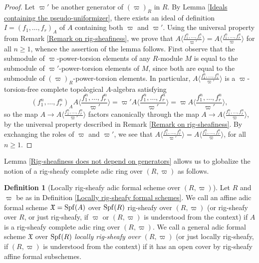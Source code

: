 \documentclass[12pt,twoside,a4paper]{article}
\theoremstyle{definition}
\newtheorem{mydef}[thm]{Definition}
\theoremstyle{remark}
\newcommand\Spf{{\rm Spf}}
\begin{document}
\begin{proof}Let $\varpi'$ be another generator of $(\varpi)_{R}$ in $R$. By Lemma \ref{Ideals containing the pseudo-uniformizer}, there exists an ideal of definition $I=(f_1,\dots,f_r)_{A}$ of $A$ containing both $\varpi$ and $\varpi'$. Using the universal property from Remark \ref{Remark on rig-sheafiness}, we prove that $A\langle\frac{f_1^{n},\dots, f_r^{n}}{\varpi'}\rangle=A\langle\frac{f_1^{n},\dots, f_r^{n}}{\varpi}\rangle$ for all $n\geq1$, whence the assertion of the lemma follows. First observe that the submodule of $\varpi$-power-torsion elements of any $R$-module $M$ is equal to the submodule of $\varpi'$-power-torsion elements of $M$, since both are equal to the submodule of $(\varpi)_{R}$-power-torsion elements. In particular, $A\langle\frac{f_1^{n},\dots, f_r^{n}}{\varpi'}\rangle$ is a $\varpi$-torsion-free complete topological $A$-algebra satisfying \begin{equation*}(f_1^{n},\dots, f_r^{n})_{A}A\langle\frac{f_1^{n},\dots,f_r^{n}}{\varpi'}\rangle=\varpi'A\langle\frac{f_1^{n},\dots, f_r^{n}}{\varpi'}\rangle=\varpi A\langle\frac{f_1^{n},\dots, f_r^{n}}{\varpi'}\rangle,\end{equation*}so the map $A\to A\langle\frac{f_1^{n},\dots, f_r^{n}}{\varpi'}\rangle$ factors canonically through the map $A\to A\langle\frac{f_1^{n},\dots,f_r^{n}}{\varpi}\rangle$, by the universal property described in Remark \ref{Remark on rig-sheafiness}. By exchanging the roles of $\varpi$ and $\varpi'$, we see that $A\langle\frac{f_1^{n},\dots,f_{r}^{n}}{\varpi'}\rangle=A\langle\frac{f_1^{n},\dots,f_{r}^{n}}{\varpi}\rangle$, for all $n\geq1$.\end{proof}
Lemma \ref{Rig-sheafiness does not depend on generators} allows us to globalize the notion of a rig-sheafy complete adic ring over $(R, \varpi)$ as follows.
\begin{mydef}[Locally rig-sheafy adic formal scheme over $(R, \varpi)$]\label{Locally rig-sheafy formal schemes 2}Let $R$ and $\varpi$ be as in Definition \ref{Locally rig-sheafy formal schemes}. We call an affine adic formal scheme $\mathfrak{X}=\Spf(A)$ over $\Spf(R)$ rig-sheafy over $(R, \varpi)$ (or rig-sheafy over $R$, or just rig-sheafy, if $\varpi$ or $(R, \varpi)$ is understood from the context) if $A$ is a rig-sheafy complete adic ring over $(R, \varpi)$. We call a general adic formal scheme $\mathfrak{X}$ over $\Spf(R)$ \textit{locally rig-sheafy over $(R, \varpi)$} (or just locally rig-sheafy, if $(R, \varpi)$ is understood from the context) if it has an open cover by rig-sheafy affine formal subschemes.\end{mydef} 
\end{document}
